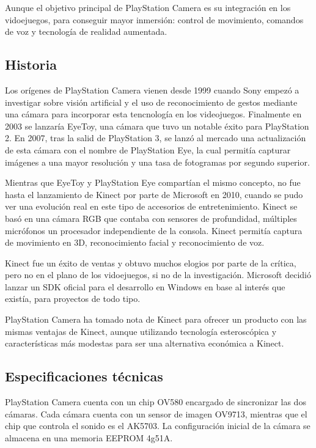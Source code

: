 Aunque el objetivo principal de PlayStation Camera es su integración en los
vidoejuegos, para conseguir mayor inmersión: control de movimiento, comandos de
voz y tecnología de realidad aumentada.

\subsection{Historia}
Los orígenes de PlayStation Camera vienen desde 1999 cuando Sony empezó a
investigar sobre visión artificial y el uso de reconocimiento de gestos mediante
una cámara para incorporar esta tencnología en los videojuegos. Finalmente en
2003 se lanzaría EyeToy, una cámara que tuvo un notable éxito para PlayStation
2. En 2007, tras la salid de PlayStation 3, se lanzó al mercado una
actualización de esta cámara con el nombre de PlayStation Eye, la cual permitía
capturar imágenes a una mayor resolución y una tasa de fotogramas por segundo
superior.

Mientras que EyeToy y PlayStation Eye compartían el mismo concepto, no fue hasta
el lanzamiento de Kinect por parte de Microsoft en 2010, cuando se pudo ver una
evolución real en este tipo de accesorios de entretenimiento. Kinect se basó en
una cámara RGB que contaba con sensores de profundidad, múltiples micrófonos  un
procesador independiente de la consola. Kinect permitía captura de movimiento en
3D, reconocimiento facial y reconocimiento de voz.

Kinect fue un éxito de ventas y obtuvo muchos elogios por parte de la crítica,
pero no en el plano de los vidoejuegos, si no de la investigación. Microsoft
decidió lanzar un SDK oficial para el desarrollo en Windows en base al interés
que existía, para proyectos de todo tipo.

PlayStation Camera ha tomado nota de Kinect para ofrecer un producto con las
mismas ventajas de Kinect, aunque utilizando tecnología esteroscópica y
características más modestas para ser una alternativa económica a Kinect.

\subsection{Especificaciones técnicas}

PlayStation Camera cuenta con un chip OV580 encargado de sincronizar las dos
cámaras. Cada cámara cuenta con un sensor de imagen OV9713, mientras que el chip
que controla el sonido es el AK5703. La configuración inicial de la cámara se
almacena en una memoria EEPROM 4g51A.

